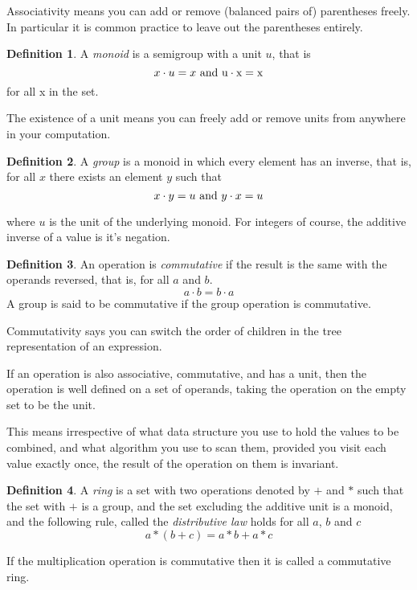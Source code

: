 \documentclass[oneside]{book}
\theoremstyle{plain}
\theoremstyle{definition}
\newtheorem{definition}{Definition}
\theoremstyle{plain}
\begin{document}
Associativity means you can add or remove (balanced pairs of) parentheses freely.
In particular it is common practice to leave out the parentheses entirely.

\begin{definition}
A {\em monoid} is a semigroup with a unit $u$, that is
$$x\cdot u = x \rm{\ and\ }u \cdot x = x$$
for all x in the set.
\end{definition}

The existence of a unit means you can freely add or remove units from
anywhere in your computation.

\begin{definition}
A {\em group} is a monoid in which every element has an inverse, that is,
for all $x$ there exists an element $y$ such that
$$x \cdot y = u {\rm\ and\ } y \cdot x = u $$
\end{definition}
where $u$ is the unit of the underlying monoid. For integers of course,
the additive inverse of a value is it's negation.

\begin{definition}
An operation is {\em commutative} if the result is the same with the operands
reversed, that is, for all $a$ and $b$.
$$a \cdot b = b \cdot a$$
A group is said to be commutative if the group operation is commutative.
\end{definition}

Commutativity says you can switch the order of children in the tree representation
of an expression.

If an operation is also associative, commutative, and has a unit, then the operation
is well defined on a set of operands, taking the operation on the empty
set to be the unit. 

This means irrespective of what data structure you use to hold the
values to be combined, and what algorithm you use to scan them,
provided you visit each value exactly once, the result of the
operation on them is invariant.

\begin{definition}
A {\em ring} is a set with two operations denoted by $+$ and $*$ such
that the set with $+$ is a group, and the set excluding the additive
unit is a monoid, and the following rule, called the
{\em distributive law} holds for all $a$, $b$ and $c$
$$a * (b + c)  = a * b + a * c$$

If the multiplication operation is commutative then it is called
a commutative ring.
\end{definition}
\end{document}
